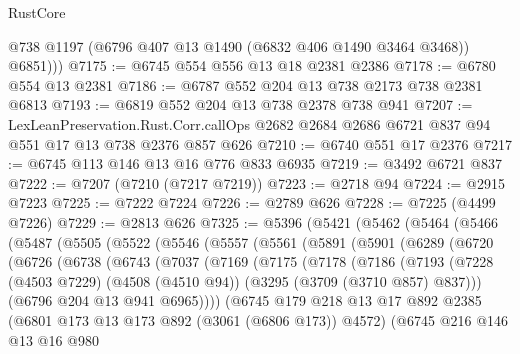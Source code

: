 \begin{lexlean}{RustCore}
\begin{coremodule}
          @738
          @1197
          (@6796 @407 @13 @1490 (@6832 @406 @1490 @3464 @3468))
          @6851)))
@7175 := @6745 @554 @556 @13 @18 @2381 @2386
@7178 := @6780 @554 @13 @2381
@7186 := @6787 @552 @204 @13 @738 @2173 @738 @2381 @6813
@7193 := @6819 @552 @204 @13 @738 @2378 @738 @941
@7207 := LexLeanPreservation.Rust.Corr.callOps
    @2682
    @2684
    @2686
    @6721
    @837
    @94
    @551
    @17
    @13
    @738
    @2376
    @857
    @626
@7210 := @6740 @551 @17 @2376
@7217 := @6745 @113 @146 @13 @16 @776 @833 @6935
@7219 := @3492 @6721 @837
@7222 := @7207 (@7210 (@7217 @7219))
@7223 := @2718 @94
@7224 := @2915 @7223
@7225 := @7222 @7224
@7226 := @2789 @626
@7228 := @7225 (@4499 @7226)
@7229 := @2813 @626
@7325 := @5396
    (@5421
      (@5462
        (@5464
          (@5466
            (@5487
              (@5505
                (@5522
                  (@5546
                    (@5557
                      (@5561
                        (@5891
                          (@5901
                            (@6289
                              (@6720
                                (@6726
                                  (@6738
                                    (@6743
                                      (@7037
                                        (@7169
                                          (@7175
                                            (@7178
                                              (@7186
                                                (@7193
                                                  (@7228
                                                    (@4503 @7229)
                                                    (@4508 (@4510 @94))
                                                    (@3295 (@3709 (@3710 @857) @837)))
                                                  (@6796 @204 @13 @941 @6965))))
                                            (@6745
                                              @179
                                              @218
                                              @13
                                              @17
                                              @892
                                              @2385
                                              (@6801 @173 @13 @173 @892 (@3061 (@6806 @173)) @4572)
                                              (@6745
                                                @216
                                                @146
                                                @13
                                                @16
                                                @980

\end{coremodule}
\end{lexlean}
